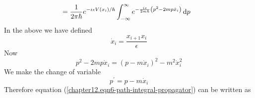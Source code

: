 \begin{enumerate}
\begin{align}
		&= \frac{1}{2\pi\hbar} e^{-{i\mkern1mu} \epsilon V(x_i)/\hbar} \int_{-\infty}^{\infty} e^{-\frac{{i\mkern1mu} \epsilon}{2 m \hbar} \left(p^2 - 2 m p \dot{x}_i \right)} \dd{p}
		\label{chapter12.eqn6-path-integral-propagator}
	\end{align}
	In the above we have defined
	\begin{equation}
		\dot{x}_i = \frac{x_{i+1} x_i}{\epsilon}
	\end{equation}
	Now
	\begin{equation}
		p^2 - 2m p \dot{x}_i = (p- m \dot{x}_i)^2 - m^2 \dot{x}_i^2
	\end{equation}
	We make the change of variable
	\begin{equation}
		p^\prime = p -m \dot{x}_i
	\end{equation}
	Therefore equation (\ref{chapter12.eqn6-path-integral-propagator}) can be written as
	

\end{enumerate}
